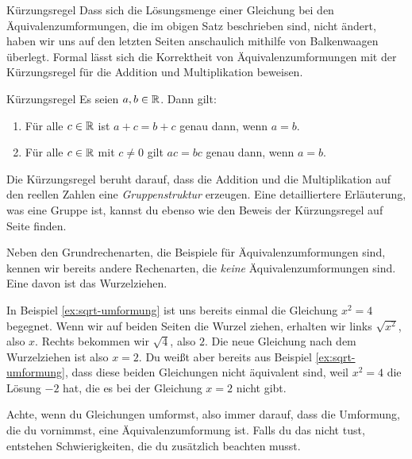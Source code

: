 \documentclass[../../main.tex]{subfiles}
\begin{document}
\begin{advanced}{Kürzungsregel}
    Dass sich die Lösungsmenge einer Gleichung bei den Äquivalenzumformungen, die im obigen Satz beschrieben sind, nicht ändert, haben wir uns auf den letzten Seiten anschaulich mithilfe von Balkenwaagen überlegt. Formal lässt sich die Korrektheit von Äquivalenzumformungen mit der Kürzungsregel für die Addition und Multiplikation beweisen.
    
    \begin{theorem}{Kürzungsregel}
        Es seien $a,b\in\mathbb{R}$. Dann gilt: 
        \begin{enumerate}
            \item Für alle $c\in\mathbb{R}$ ist $a+c=b+c$ genau dann, wenn $a=b$.
            \item Für alle $c\in\mathbb{R}$ mit $c\neq 0$ gilt $ac=bc$ genau dann, wenn $a=b$.
        \end{enumerate}
    \end{theorem}
    
    Die Kürzungsregel beruht darauf, dass die Addition und die Multiplikation auf den reellen Zahlen eine \emph{Gruppenstruktur} erzeugen. Eine detailliertere Erläuterung, was eine Gruppe ist, kannst du ebenso wie den Beweis der Kürzungsregel auf Seite \pageref{} finden. 
\end{advanced}

Neben den Grundrechenarten, die Beispiele für Äquivalenzumformungen sind, kennen wir bereits andere Rechenarten, die \emph{keine} Äquivalenzumformungen sind. Eine davon ist das Wurzelziehen.

\begin{example}{}
    In Beispiel \ref{ex:sqrt-umformung} ist uns bereits einmal die Gleichung $x^2=4$ begegnet. Wenn wir auf beiden Seiten die Wurzel ziehen, erhalten wir links $\sqrt{x^2}$, also $x$. Rechts bekommen wir $\sqrt{4}$, also $2$. Die neue Gleichung nach dem Wurzelziehen ist also $x=2$. Du weißt aber bereits aus Beispiel \ref{ex:sqrt-umformung}, dass diese beiden Gleichungen nicht äquivalent sind, weil $x^2=4$ die Lösung $-2$ hat, die es bei der Gleichung $x=2$ nicht gibt.
\end{example}

Achte, wenn du Gleichungen umformst, also immer darauf, dass die Umformung, die du vornimmst, eine Äquivalenzumformung ist. Falls du das nicht tust, entstehen Schwierigkeiten, die du zusätzlich beachten musst.
\end{document}
